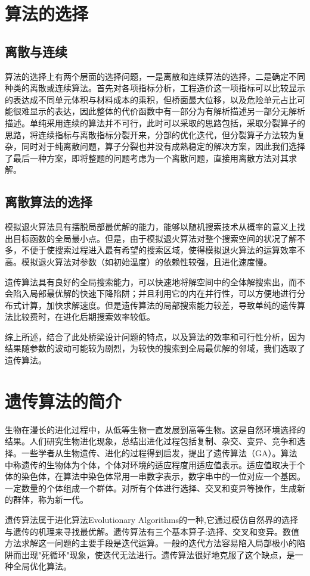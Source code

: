 \documentclass[forprint]{WHUBachelor}
\begin{document}
\section{算法的选择}
\subsection{离散与连续}
算法的选择上有两个层面的选择问题，一是离散和连续算法的选择，二是确定不同种类的离散或连续算法。首先对各项指标分析，工程造价这一项指标可以比较显示的表达成不同单元体积与材料成本的乘积，但桥面最大位移，以及危险单元占比可能很难显示的表达，因此整体的代价函数中有一部分为有解析描述另一部分无解析描述。单纯采用连续的算法并不可行，此时可以采取的思路包括，采取分裂算子的思路，将连续指标与离散指标分裂开来，分部的优化迭代，但分裂算子方法较为复杂，同时对于纯离散问题，算子分裂也并没有成熟稳定的解决方案，因此我们选择了最后一种方案，即将整题的问题考虑为一个离散问题，直接用离散方法对其求解。\par
\subsection{离散算法的选择}
模拟退火算法具有摆脱局部最优解的能力，能够以随机搜索技术从概率的意义上找出目标函数的全局最小点。但是，由于模拟退火算法对整个搜索空间的状况了解不多，不便于使搜索过程进入最有希望的搜索区域，使得模拟退火算法的运算效率不高。模拟退火算法对参数（如初始温度）的依赖性较强，且进化速度慢。\par
遗传算法具有良好的全局搜索能力，可以快速地将解空间中的全体解搜索出，而不会陷入局部最优解的快速下降陷阱；并且利用它的内在并行性，可以方便地进行分布式计算，加快求解速度。但是遗传算法的局部搜索能力较差，导致单纯的遗传算法比较费时，在进化后期搜索效率较低。\par
综上所述，结合了此处桥梁设计问题的特点，以及算法的效率和可行性分析，因为结果随参数的波动可能较为剧烈，为较快的搜索到全局最优解的邻域，我们选取了遗传算法。
\section{遗传算法的简介}
生物在漫长的进化过程中，从低等生物一直发展到高等生物。这是自然环境选择的结果。人们研究生物进化现象，总结出进化过程包括复制、杂交、变异、竞争和选择。一些学者从生物遗传、进化的过程得到启发，提出了遗传算法（GA）。算法中称遗传的生物体为个体，个体对环境的适应程度用适应值表示。适应值取决于个体的染色体，在算法中染色体常用一串数字表示，数字串中的一位对应一个基因。一定数量的个体组成一个群体。对所有个体进行选择、交叉和变异等操作，生成新的群体，称为新一代。\par
遗传算法属于进化算法Evolutionary Algorithms的一种,它通过模仿自然界的选择与遗传的机理来寻找最优解。遗传算法有三个基本算子:选择、交叉和变异。数值方法求解这一问题的主要手段是迭代运算。一般的迭代方法容易陷入局部极小的陷阱而出现"死循环"现象，使迭代无法进行。遗传算法很好地克服了这个缺点，是一种全局优化算法。\par
\end{document}
